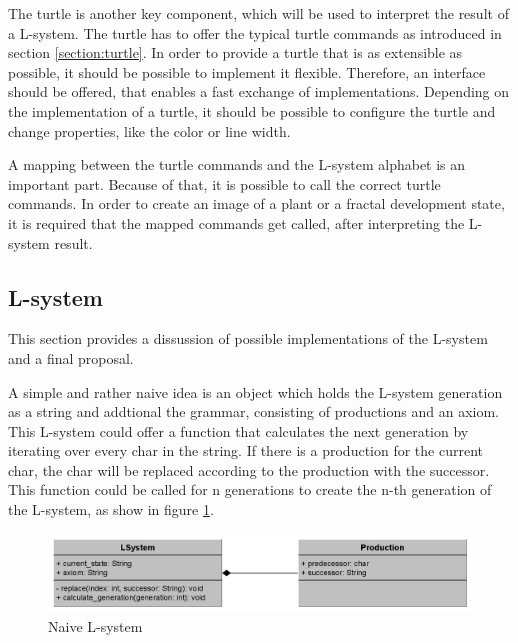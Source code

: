 \documentclass[english]{cpp-hmwk}
\begin{document}
\medskip

\noindent The turtle is another key component, which will be used to interpret the result of a L-system. The turtle has to offer the typical turtle commands as introduced in section \ref{section:turtle}. In order to provide a turtle that is as extensible as possible, it should be possible to implement it flexible. Therefore, an interface should be offered, that enables a fast exchange of implementations. Depending on the implementation of a turtle, it should be possible to configure the turtle and change properties, like the color or line width.

\medskip
\noindent A mapping between the turtle commands and the L-system alphabet is an important part. Because of that, it is possible to call the correct turtle commands. In order to create an image of a plant or a fractal development state, it is required that the mapped commands get called, after interpreting the L-system result.


\subsection{L-system}
\label{section:lsystem_discussion}
This section provides a dissussion of possible implementations of the L-system and a final proposal.

\medskip

\noindent A simple and rather naive idea is an object which holds the L-system generation as a string and addtional the grammar, consisting of productions and an axiom. This L-system could offer a function that calculates the next generation by iterating over every char in the string. If there is a production for the current char, the char will be replaced according to the production with the successor. This function could be called for n generations to create the n-th generation of the L-system, as show in figure \ref{figure:naive_lsystem}.

\begin{figure}[h!]
	\centering
	\includegraphics[width=1\columnwidth]{../graphs/class_diagram_l_system_naive.png}
	\caption{Naive L-system}
	\label{figure:naive_lsystem}
\end{figure}
\end{document}
